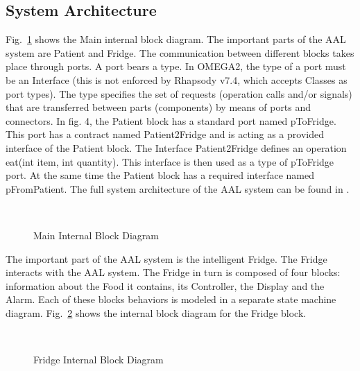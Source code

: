 \documentclass[a4paper,twoside]{article}
\begin{document}
\subsection{System Architecture}
Fig.~\ref{fig:mainibd} shows the Main internal block diagram. The important parts of the AAL system are Patient and Fridge. The communication between different blocks takes place through ports. A  port  bears  a  type.  In  OMEGA2,  the  type  of  a  port  must  be  an  Interface  (this  is  not  enforced  by Rhapsody v7.4, which accepts Classes as port types). The type specifies the set of requests (operation calls and/or signals) that  are transferred between parts (components) by means of ports and connectors. In fig. 4, the Patient block has a standard port named pToFridge. This port has a contract named Patient2Fridge and is acting as a provided interface of the Patient block. The Interface Patient2Fridge defines an operation eat(int item, int quantity). This interface is then used as a type of pToFridge port. At the same time the Patient block has a required interface named pFromPatient. 
The full system architecture of the AAL system can be found in \cite{test8}. 

\begin{figure}[!h]
  \vspace{8cm}~
  \centering
  {}
  \caption{Main Internal Block Diagram}
  \label{fig:mainibd}
 \end{figure}



The important part of the AAL system is the intelligent Fridge. The Fridge interacts with the AAL system. The Fridge in turn is composed of four blocks: information about the Food it contains, its Controller, the Display and the Alarm. Each of these blocks behaviors is modeled in a separate state machine diagram. Fig.~\ref{fig:fridgeibd} shows the internal block diagram for the Fridge block.

\begin{figure}[!h]
  \vspace{8cm}~
  \centering
  {}
  \caption{Fridge Internal Block Diagram}
  \label{fig:fridgeibd}
 \end{figure}
\end{document}
